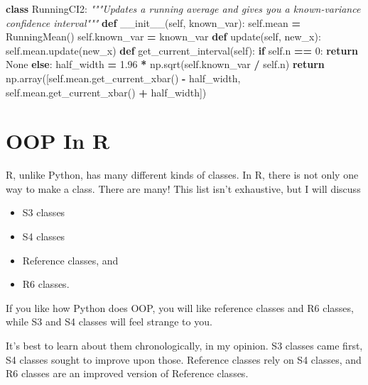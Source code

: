 \documentclass[
  12pt,
  krantz2]{krantz}
\makeatletter
\newenvironment{Shaded}{\begin{snugshade}}{\end{snugshade}}
\newcommand{\CommentTok}[1]{\textcolor[rgb]{0.37,0.37,0.37}{\textit{#1}}}
\newcommand{\ControlFlowTok}[1]{\textcolor[rgb]{0.27,0.27,0.27}{\textbf{#1}}}
\newcommand{\DecValTok}[1]{\textcolor[rgb]{0.06,0.06,0.06}{#1}}
\newcommand{\FloatTok}[1]{\textcolor[rgb]{0.06,0.06,0.06}{#1}}
\newcommand{\FunctionTok}[1]{\textcolor[rgb]{0,0,0}{#1}}
\newcommand{\KeywordTok}[1]{\textcolor[rgb]{0.27,0.27,0.27}{\textbf{#1}}}
\newcommand{\NormalTok}[1]{#1}
\newcommand{\OperatorTok}[1]{\textcolor[rgb]{0.43,0.43,0.43}{\textbf{#1}}}
\newcommand{\VariableTok}[1]{\textcolor[rgb]{0,0,0}{#1}}
\providecommand{\tightlist}{%
  \setlength{\itemsep}{0pt}\setlength{\parskip}{0pt}}
\newenvironment{kframe}{%
\medskip{}
\setlength{\fboxsep}{.8em}
 \def\at@end@of@kframe{}%
 \ifinner\ifhmode%
  \def\at@end@of@kframe{\end{minipage}}%
  \begin{minipage}{\columnwidth}%
 \fi\fi%
 \def\FrameCommand##1{\hskip\@totalleftmargin \hskip-\fboxsep
 \colorbox{shadecolor}{##1}\hskip-\fboxsep
     \hskip-\linewidth \hskip-\@totalleftmargin \hskip\columnwidth}%
 \MakeFramed {\advance\hsize-\width
   \@totalleftmargin\z@ \linewidth\hsize
   \@setminipage}}%
 {\par\unskip\endMakeFramed%
 \at@end@of@kframe}
\renewenvironment{Shaded}{\begin{kframe}}{\end{kframe}}
\makeatother
\begin{document}
\begin{Shaded}
\begin{Highlighting}[]
\KeywordTok{class}\NormalTok{ RunningCI2:}
  \CommentTok{"""Updates a running average and gives you a known{-}variance confidence interval"""}
  \KeywordTok{def} \FunctionTok{\_\_init\_\_}\NormalTok{(}\VariableTok{self}\NormalTok{, known\_var):}
    \VariableTok{self}\NormalTok{.mean }\OperatorTok{=}\NormalTok{ RunningMean()}
    \VariableTok{self}\NormalTok{.known\_var }\OperatorTok{=}\NormalTok{ known\_var}
  \KeywordTok{def}\NormalTok{ update(}\VariableTok{self}\NormalTok{, new\_x):    }
    \VariableTok{self}\NormalTok{.mean.update(new\_x)}
  \KeywordTok{def}\NormalTok{ get\_current\_interval(}\VariableTok{self}\NormalTok{):}
    \ControlFlowTok{if} \VariableTok{self}\NormalTok{.n }\OperatorTok{==} \DecValTok{0}\NormalTok{:}
      \ControlFlowTok{return} \VariableTok{None}
    \ControlFlowTok{else}\NormalTok{:}
\NormalTok{      half\_width }\OperatorTok{=} \FloatTok{1.96} \OperatorTok{*}\NormalTok{ np.sqrt(}\VariableTok{self}\NormalTok{.known\_var }\OperatorTok{/} \VariableTok{self}\NormalTok{.n)  }
      \ControlFlowTok{return}\NormalTok{ np.array([}\VariableTok{self}\NormalTok{.mean.get\_current\_xbar() }\OperatorTok{{-}}\NormalTok{ half\_width, }\VariableTok{self}\NormalTok{.mean.get\_current\_xbar() }\OperatorTok{+}\NormalTok{ half\_width])}
\end{Highlighting}
\end{Shaded}

\hypertarget{oop-in-r}{%
\section{OOP In R}\label{oop-in-r}}

R, unlike Python, has many different kinds of classes. In R, there is not only one way to make a class. There are many! This list isn't exhaustive, but I will discuss

\begin{itemize}
\tightlist
\item
  S3 classes
\item
  S4 classes
\item
  Reference classes, and
\item
  R6 classes.
\end{itemize}

If you like how Python does OOP, you will like reference classes and R6 classes, while S3 and S4 classes will feel strange to you.

It's best to learn about them chronologically, in my opinion. S3 classes came first, S4 classes sought to improve upon those. Reference classes rely on S4 classes, and R6 classes are an improved version of Reference classes.
\end{document}
